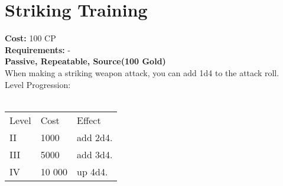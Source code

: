 \section{Striking Training}
\textbf{Cost:} 100 CP\\
\textbf{Requirements:} -\\
\textbf{Passive, Repeatable, Source(100 Gold)}\\
When making a striking weapon attack, you can add 1d4 to the attack roll.
\\
Level Progression:\\
\\
\begin{tabular}{l | l | l}
	Level & Cost & Effect\\
	II & 1000 & add 2d4.\\
	III & 5000 & add 3d4.\\
	IV & 10 000 & up 4d4.\\
\end{tabular}
